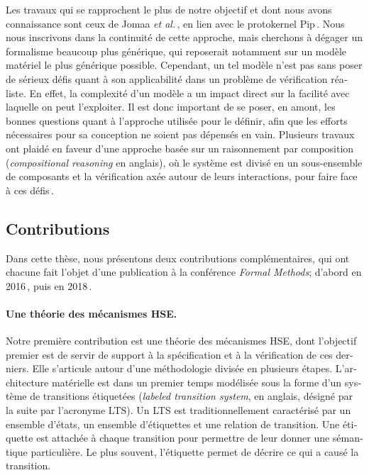 \begin{otherlanguage}{french}
  Les travaux qui se rapprochent le plus de notre objectif et dont nous avons
  connaissance sont ceux de Jomaa \emph{et al.}\,\cite{jomaa2016mmu}, en lien
  avec le protokernel Pip\,\cite{pipwww}.
  Nous nous inscrivons dans la continuité de cette approche, mais cherchons à
  dégager un formalisme beaucoup plus générique, qui reposerait notamment sur un
  modèle matériel le plus générique possible.
  Cependant, un tel modèle n’est pas sans poser de sérieux défis quant à son
  applicabilité dans un problème de vérification réaliste.
  En effet, la complexité d’un modèle a un impact direct sur la facilité avec
  laquelle on peut l’exploiter.
  Il est donc important de se poser, en amont, les bonnes questions quant à
  l’approche utilisée pour le définir, afin que les efforts nécessaires pour sa
  conception ne soient pas dépensés en vain.
  Plusieurs travaux ont plaidé en faveur d’une approche basée sur un
  raisonnement par composition (\emph{compositional reasoning} en anglais), où
  le système est divisé en un sous-ensemble de composants et la vérification
  axée autour de leurs interactions, pour faire face à ces
  défis\,\cite{garg2010compositional,heyman2012securemodel}.

  \subsection*{Contributions}

  Dans cette thèse, nous présentons deux contributions complémentaires, qui ont
  chacune fait l’objet d’une publication à la conférence \emph{Formal Methods};
  d’abord en 2016\,\cite{letan2016speccert}, puis en
  2018\,\cite{letan2018freespec}.

  \paragraph{Une théorie des mécanismes HSE.}
  Notre première contribution est une théorie des mécanismes HSE, dont
  l’objectif premier est de servir de support à la spécification et à la
  vérification de ces derniers.
  Elle s’articule autour d’une méthodologie divisée en plusieurs étapes.
  L’architecture matérielle est dans un premier temps modélisée sous la forme
  d’un système de transitions étiquetées (\emph{labeled transition system}, en
  anglais, désigné par la suite par l’acronyme LTS).
  Un LTS est traditionnellement caractérisé par un ensemble d’états, un ensemble
  d’étiquettes et une relation de transition.
  Une étiquette est attachée à chaque transition pour permettre de leur donner
  une sémantique particulière.
  Le plus souvent, l’étiquette permet de décrire ce qui a causé la transition.


\end{otherlanguage}

